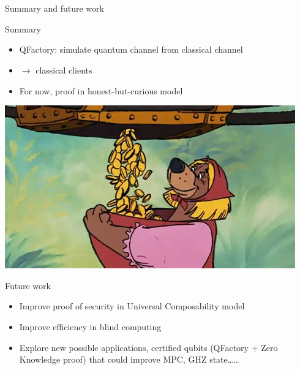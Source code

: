 \documentclass[table]{beamer}
\begin{document}
\section{}
\begin{frame}{Summary and future work}
  \begin{block}{Summary}
    \begin{minipage}{.6\linewidth}
      \begin{itemize}
      \item QFactory: simulate quantum channel from classical channel
      \item {} $\rightarrow$ classical clients
      \item For now, proof in honest-but-curious model
      \end{itemize}      
    \end{minipage}%
    \begin{minipage}{.4\linewidth}
      \includegraphics[width=\textwidth]{figures/money_fille.jpeg}        
    \end{minipage}
  \end{block}
  \begin{exampleblock}{Future work}
    \begin{itemize}
    \item Improve proof of security in Universal Composability model
    \item Improve efficiency in blind computing
    \item Explore new possible applications, certified qubits (QFactory + Zero Knowledge proof) that could improve MPC, GHZ state\dots\dots
    \end{itemize}
  \end{exampleblock}
\end{frame}

\end{document}
